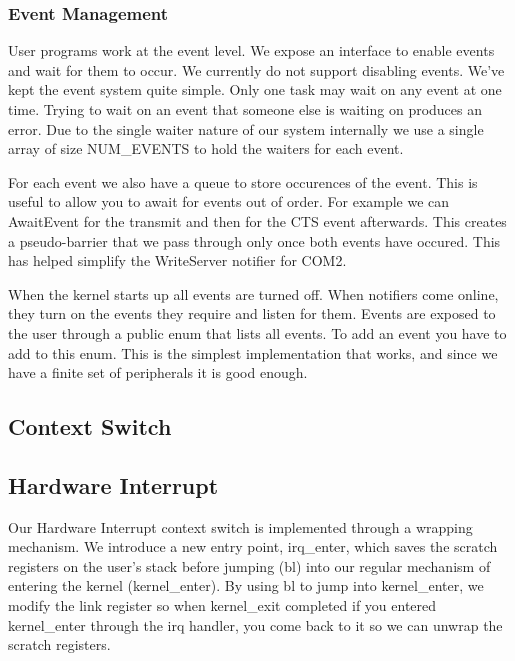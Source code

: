 \documentclass{article}
\begin{document}
\subsubsection{Event Management}

User programs work at the event level. We expose an interface to enable events and wait for them to occur. We currently do not support disabling events. We've kept the event system quite simple. Only one task may wait on any event at one time. Trying to wait on an event that someone else is waiting on produces an error. Due to the single waiter nature of our system internally we use a single array of size NUM\_EVENTS to hold the waiters for each event. 

For each event we also have a queue to store occurences of the event. This is useful to allow you to await for events out of order. For example we can AwaitEvent for the transmit and then for the CTS event afterwards. This creates a pseudo-barrier that we pass through only once both events have occured. This has helped simplify the WriteServer notifier for COM2.

When the kernel starts up all events are turned off. When notifiers come online, they turn on the events they require and listen for them. Events are exposed to the user through a public enum that lists all events. To add an event you have to add to this enum. This is the simplest implementation that works, and since we have a finite set of peripherals it is good enough.

\subsection{Context Switch}

\subsection{Hardware Interrupt}

Our Hardware Interrupt context switch is implemented through a wrapping mechanism. We introduce a new entry point, irq\_enter, which saves the scratch registers on the user's stack before jumping (bl) into our regular mechanism of entering the kernel (kernel\_enter). By using bl to jump into kernel\_enter, we modify the link register so when kernel\_exit completed if you entered kernel\_enter through the irq handler, you come back to it so we can unwrap the scratch registers.
\end{document}
